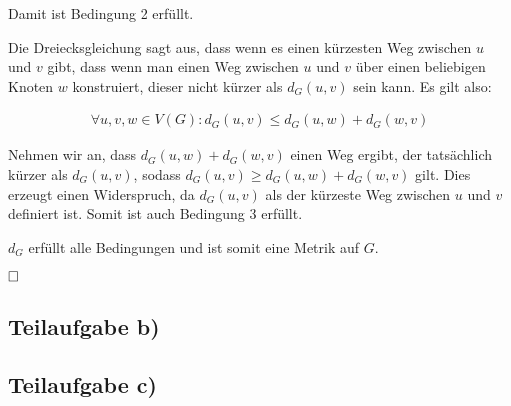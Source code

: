 \documentclass[12pt]{scrartcl}%
\theoremstyle{nonumberplain}
\begin{document}
Damit ist Bedingung 2 erfüllt.

Die Dreiecksgleichung sagt aus, dass wenn es einen kürzesten Weg zwischen $u$ und $v$ gibt, dass wenn man einen Weg zwischen $u$ und $v$ über einen beliebigen Knoten $w$ konstruiert, dieser nicht kürzer als $d_G(u,v)$ sein kann. Es gilt also:

\begin{align*}
	\forall u,v,w \in V(G): d_G(u,v) \le d_G(u,w) + d_G(w,v)
\end{align*}

Nehmen wir an, dass $d_G(u,w) + d_G(w,v)$ einen Weg ergibt, der tatsächlich kürzer als $d_G(u,v)$, sodass $d_G(u,v) \ge d_G(u,w) + d_G(w,v)$ gilt. Dies erzeugt einen Widerspruch, da $d_G(u,v)$ als der kürzeste Weg zwischen $u$ und $v$ definiert ist. Somit ist auch Bedingung 3 erfüllt.

$d_G$ erfüllt alle Bedingungen und ist somit eine Metrik auf $G$.

$\hfill \square$

\subsection*{Teilaufgabe b)}


\subsection*{Teilaufgabe c)}
\end{document}
